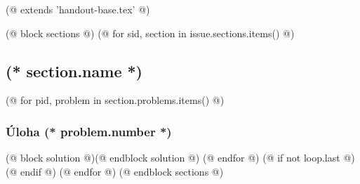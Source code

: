 (@ extends 'handout-base.tex' @)

(@ block sections @)
    (@ for sid, section in issue.sections.items() @)
        \subsection{(* section.name *)}
        (@ for pid, problem in section.problems.items() @)
            \subsubsection{Úloha (* problem.number *)}
            (@ block solution @)(@ endblock solution @)
        (@ endfor @)
        (@ if not loop.last @)\newpage(@ endif @)
    (@ endfor @)
(@ endblock sections @)
